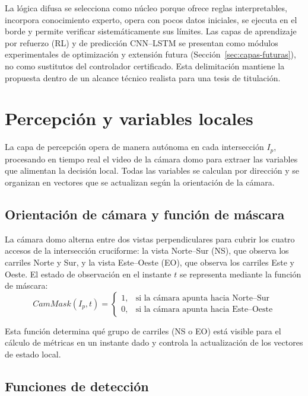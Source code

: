 La lógica difusa se selecciona como núcleo porque ofrece reglas interpretables, incorpora
conocimiento experto, opera con pocos datos iniciales, se ejecuta en el borde y permite
verificar sistemáticamente sus límites. Las capas de aprendizaje por refuerzo (RL) y de
predicción CNN--LSTM se presentan como módulos experimentales de optimización y extensión
futura (Sección~\ref{sec:capas-futuras}), no como sustitutos del controlador certificado.
Esta delimitación mantiene la propuesta dentro de un alcance técnico realista para una tesis
de titulación.

\section{Percepción y variables locales}\label{sec:percepcion}

La capa de percepción opera de manera autónoma en cada intersección $I_{p}$, procesando en
tiempo real el video de la cámara domo para extraer las variables que alimentan la decisión
local. Todas las variables se calculan por dirección y se organizan en vectores que se
actualizan según la orientación de la cámara.

\subsection{Orientación de cámara y función de máscara}\label{subsec:cammask}

La cámara domo alterna entre dos vistas perpendiculares para cubrir los cuatro accesos de la
intersección cruciforme: la vista Norte--Sur (NS), que observa los carriles Norte y Sur, y la
vista Este--Oeste (EO), que observa los carriles Este y Oeste. El estado de observación en el
instante $t$ se representa mediante la función de máscara:
\[
CamMask(I_{p},t) =
\begin{cases}
1, & \text{si la cámara apunta hacia Norte--Sur}\\[2pt]
0, & \text{si la cámara apunta hacia Este--Oeste}
\end{cases}
\]

Esta función determina qué grupo de carriles (NS o EO) está visible para el cálculo de
métricas en un instante dado y controla la actualización de los vectores de estado local.

\subsection{Funciones de detección}\label{subsec:funciones-deteccion}

